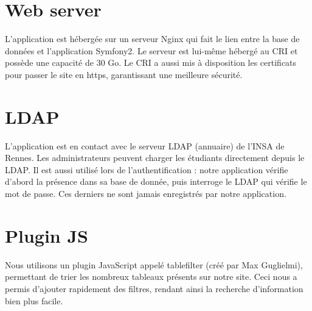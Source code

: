 \section{Web server}

L'application est hébergée sur un serveur Nginx qui fait le lien entre la base de données et l'application Symfony2. Le serveur est lui-même hébergé au CRI et possède une capacité de 30 Go. Le CRI a aussi mis à disposition les certificats pour passer le site en https, garantissant une meilleure sécurité.

\section{LDAP}

L'application est en contact avec le serveur LDAP (annuaire) de l'INSA de Rennes.
Les administrateurs peuvent charger les étudiants directement depuis le LDAP. Il est aussi utilisé lors de l'authentification : notre application vérifie d'abord la présence dans sa base de donnée, puis interroge le LDAP qui vérifie le mot de passe. Ces derniers ne sont jamais enregistrés par notre application. 

\section{Plugin JS}

Nous utilisons un plugin JavaScript appelé tablefilter (créé par Max Guglielmi), permettant de trier les nombreux tableaux présents sur notre site. Ceci nous a permis d'ajouter rapidement des filtres, rendant ainsi la recherche d'information bien plus facile.